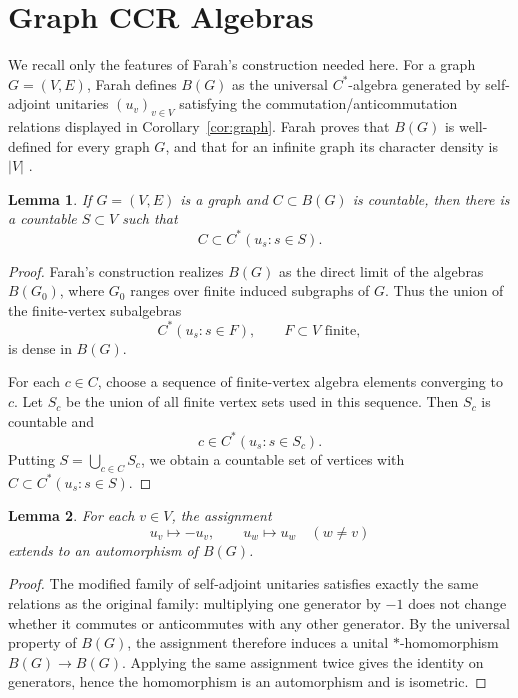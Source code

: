 \documentclass[11pt]{article}
\newtheorem{lemma}{Lemma}
\begin{document}
\section*{Graph CCR Algebras}

We recall only the features of Farah's construction needed here.  For a graph
\(G=(V,E)\), Farah defines \(B(G)\) as the universal \(C^*\)-algebra
generated by self-adjoint unitaries \((u_v)_{v\in V}\) satisfying the
commutation/anticommutation relations displayed in
Corollary~\ref{cor:graph}.  Farah proves that \(B(G)\) is well-defined for
every graph \(G\), and that for an infinite graph its character density is
\(|V|\) \cite[Lemma 1.1]{FarahCCR}.

\begin{lemma}
\label{lem:support}
If \(G=(V,E)\) is a graph and \(C\subset B(G)\) is countable, then there is
a countable \(S\subset V\) such that
\[
        C\subset C^*(u_s:s\in S).
\]
\end{lemma}

\begin{proof}
Farah's construction realizes \(B(G)\) as the direct limit of the algebras
\(B(G_0)\), where \(G_0\) ranges over finite induced subgraphs of \(G\).
Thus the union of the finite-vertex subalgebras
\[
        C^*(u_s:s\in F),\qquad F\subset V\text{ finite},
\]
is dense in \(B(G)\).

For each \(c\in C\), choose a sequence of finite-vertex algebra elements
converging to \(c\).  Let \(S_c\) be the union of all finite vertex sets used
in this sequence.  Then \(S_c\) is countable and
\[
        c\in C^*(u_s:s\in S_c).
\]
Putting \(S=\bigcup_{c\in C}S_c\), we obtain a countable set of vertices
with \(C\subset C^*(u_s:s\in S)\).
\end{proof}

\begin{lemma}
\label{lem:flip}
For each \(v\in V\), the assignment
\[
        u_v\mapsto -u_v,\qquad u_w\mapsto u_w\quad(w\ne v)
\]
extends to an automorphism of \(B(G)\).
\end{lemma}

\begin{proof}
The modified family of self-adjoint unitaries satisfies exactly the same
relations as the original family: multiplying one generator by \(-1\) does
not change whether it commutes or anticommutes with any other generator.
By the universal property of \(B(G)\), the assignment therefore induces a
unital \(*\)-homomorphism \(B(G)\to B(G)\).  Applying the same assignment
twice gives the identity on generators, hence the homomorphism is an
automorphism and is isometric.
\end{proof}
\end{document}

